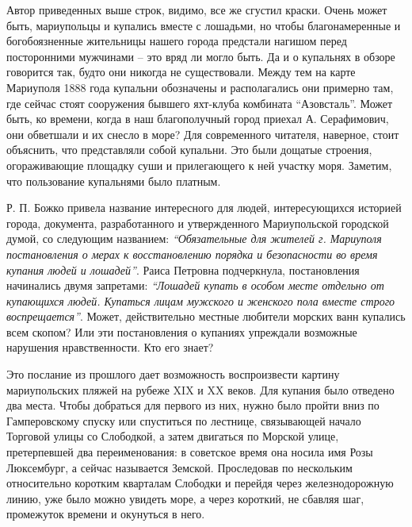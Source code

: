 Автор приведенных выше строк, видимо, все же сгустил краски. Очень может быть,
мариупольцы и купались вместе с лошадьми, но чтобы благонамеренные и
богобоязненные жительницы нашего города предстали нагишом перед посторонними
мужчинами – это вряд ли могло быть. Да и о купальнях в обзоре говорится так,
будто они никогда не существовали. Между тем на карте Мариуполя 1888 года
купальни обозначены и располагались они примерно там, где сейчас стоят
сооружения бывшего яхт-клуба комбината \enquote{Азовсталь}. Может быть, ко времени,
когда в наш благополучный город приехал А. Серафимович, они обветшали и их
снесло в море? Для современного читателя, наверное, стоит объяснить, что
представляли собой купальни. Это были дощатые строения, огораживающие площадку
суши и прилегающего к ней участку моря. Заметим, что пользование купальнями
было платным.

Р. П. Божко привела название интересного для людей, интересующихся историей
города, документа, разработанного и утвержденного Мариупольской городской
думой, со следующим названием: \emph{\enquote{Обязательные для жителей г. Мариуполя
постановления о мерах к восстановлению порядка и безопасности во время купания
людей и лошадей}}. Раиса Петровна подчеркнула, постановления начинались двумя
запретами: \emph{\enquote{Лошадей купать в особом месте отдельно от купающихся людей.
Купаться лицам мужского и женского пола вместе строго воспрещается}}. Может,
действительно местные любители морских ванн купались всем скопом? Или эти
постановления о купаниях упреждали возможные нарушения нравственности. Кто его
знает?

Это послание из прошлого дает возможность воспроизвести картину мариупольских
пляжей на рубеже XΙX и XX веков. Для купания было отведено два места. Чтобы
добраться для первого из них, нужно было пройти вниз по Гамперовскому спуску
или спуститься по лестнице, связывающей начало Торговой улицы со Слободкой, а
затем двигаться по Морской улице, претерпевшей два переименования: в советское
время она носила имя Розы Люксембург, а сейчас называется Земской. Проследовав
по нескольким относительно коротким кварталам Слободки и перейдя через
железнодорожную линию, уже было можно увидеть море, а через короткий, не
сбавляя шаг, промежуток времени и окунуться в него.

